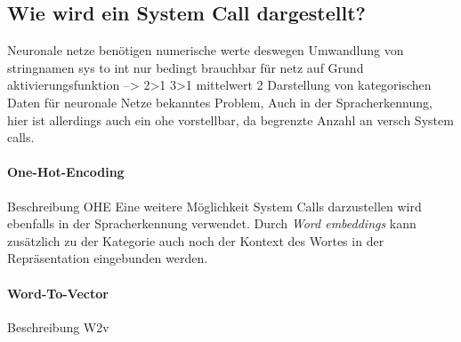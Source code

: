
        \subsection{Wie wird ein System Call dargestellt?}\label{sec:syscalldarstellung}
            Neuronale netze benötigen numerische werte deswegen Umwandlung von stringnamen 
            sys to int nur bedingt brauchbar für netz auf Grund aktivierungsfunktion --> 2>1 3>1 mittelwert 2
            Darstellung von kategorischen Daten für neuronale Netze bekanntes Problem,
            Auch in der Spracherkennung, hier ist allerdings auch ein ohe vorstellbar, da begrenzte Anzahl an versch
            System calls.
            \paragraph{One-Hot-Encoding}
                Beschreibung OHE
            Eine weitere Möglichkeit System Calls darzustellen wird ebenfalls in der Spracherkennung verwendet.
            Durch \textit{Word embeddings} kann zusätzlich zu der Kategorie auch noch der Kontext des Wortes in der Repräsentation eingebunden werden.
            \paragraph{Word-To-Vector}
                Beschreibung W2v

